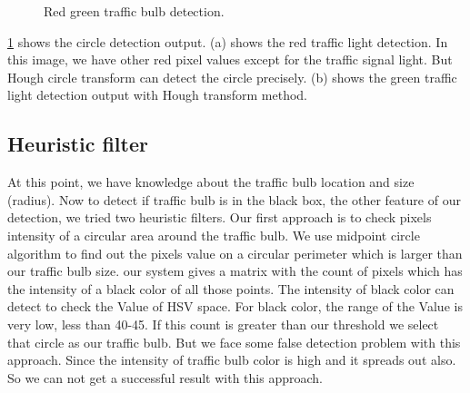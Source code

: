 \begin{figure}[!ht]
\centering
{}

\caption{Red green traffic bulb detection.}
\label{f:cir_img}
\end{figure}

\ref{f:cir_img} shows the circle detection output.
(a) shows the red traffic light detection.
In this image, we have other red pixel values except for the traffic signal light.
But Hough circle transform can detect the circle precisely.
(b) shows the green traffic light detection output with Hough transform method.

\subsection{Heuristic filter}
\label{s:filter}
At this point, we have knowledge about the traffic bulb location and size (radius).
Now to detect if traffic bulb is in the black box, the other feature of our detection, we tried two heuristic filters.
Our first approach is to check pixels intensity of a circular area around the traffic bulb.
We use midpoint circle algorithm to find out the pixels value on a circular perimeter which is larger than our traffic bulb size.
our system gives a matrix with the count of pixels which has the intensity of a black color of all those points.
The intensity of black color can detect to check the Value of HSV space.
For black color, the range of the Value is very low, less than 40-45.
If this count is greater than our threshold we select that circle as our traffic bulb.
But we face some false detection problem with this approach.
Since the intensity of traffic bulb color is high and it spreads out also.
So we can not get a successful result with this approach.

